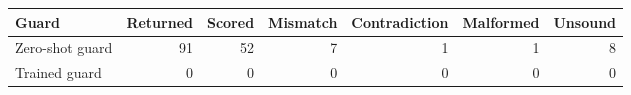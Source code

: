 \begin{tabular}{lrrrrrr}
\toprule
Guard & Returned & Scored & Mismatch & Contradiction & Malformed & Unsound \\
\midrule
Zero-shot guard & 91 & 52 & 7 & 1 & 1 & 8 \\
Trained guard & 0 & 0 & 0 & 0 & 0 & 0 \\
\bottomrule
\end{tabular}
